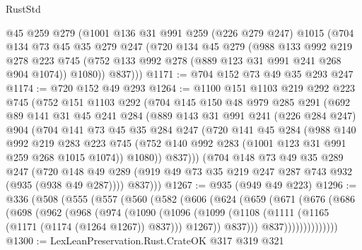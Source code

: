 \begin{lexlean}{RustStd}
\begin{coremodule}
{\begin{coremodule}
{{{{{      @45
      @259
      @279
      (@1001
        @136
        @31
        @991
        @259
        (@226 @279 @247)
        @1015
        (@704
          @134
          @73
          @45
          @35
          @279
          @247
          (@720
            @134
            @45
            @279
            (@988
              @133
              @992
              @219
              @278
              @223
              @745
              (@752 @133 @992 @278 (@889 @123 @31 @991 @241 @268 @904 @1074))
              @1080))
          @837)))
@1171 := @704 @152 @73 @49 @35 @293 @247
@1174 := @720 @152 @49 @293
@1264 := @1100
    @151
    @1103
    @219
    @292
    @223
    @745
    (@752
      @151
      @1103
      @292
      (@704
        @145
        @150
        @48
        @979
        @285
        @291
        (@692
          @89
          @141
          @31
          @45
          @241
          @284
          (@889
            @143
            @31
            @991
            @241
            (@226 @284 @247)
            @904
            (@704
              @141
              @73
              @45
              @35
              @284
              @247
              (@720
                @141
                @45
                @284
                (@988
                  @140
                  @992
                  @219
                  @283
                  @223
                  @745
                  (@752 @140 @992 @283 (@1001 @123 @31 @991 @259 @268 @1015 @1074))
                  @1080))
              @837)))
        (@704
          @148
          @73
          @49
          @35
          @289
          @247
          (@720 @148 @49 @289 (@919 @49 @73 @35 @219 @247 @287 @743 @932 (@935 (@938 @49 @287))))
          @837)))
@1267 := @935 (@949 @49 @223)
@1296 := @336
    (@508
      (@555
        (@557
          (@560
            (@582
              (@606
                (@624
                  (@659
                    (@671
                      (@676
                        (@686
                          (@698
                            (@962
                              (@968
                                (@974
                                  (@1090
                                    (@1096
                                      (@1099
                                        (@1108
                                          (@1111 (@1165 (@1171 (@1174 (@1264 @1267)) @837)))
                                          @1267))
                                      @837)))
                                @837))))))))))))))
@1300 := LexLeanPreservation.Rust.CrateOK @317 @319 @321
}}}}}
\end{coremodule}}
\end{coremodule}
\end{lexlean}
